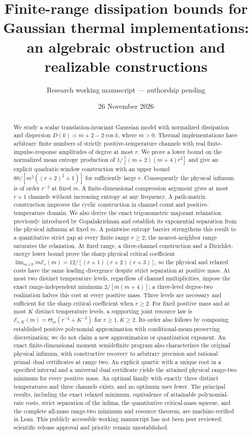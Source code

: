 \documentclass[11pt]{article}
\title{Finite-range dissipation bounds for Gaussian thermal implementations:\\ an algebraic obstruction and realizable constructions}
\author{Research working manuscript --- authorship pending}
\date{26 November 2026}
\begin{document}
\maketitle
\begin{abstract}
We study a scalar translation-invariant Gaussian model with normalized dissipation and dispersion $D(k)=m+2-2\cos k$, where $m>0$. Thermal implementations have arbitrary finite numbers of strictly positive-temperature channels with real finite-impulse-response amplitudes of degree at most $r$. We prove a lower bound on the normalized mean entropy production of $1/[(m+2)(m+4)r^2]$ and give an explicit quadratic-window construction with an upper bound $80/[m^2((r+2)^2+1)]$ for sufficiently large $r$. Consequently the physical infimum is of order $r^{-2}$ at fixed $m$. A finite-dimensional compression argument gives at most $r+1$ channels without increasing entropy at any frequency. A path-matrix construction improves the cyclic construction in channel count and positive-temperature domain. We also derive the exact trigonometric majorant relaxation previously introduced by Gopalakrishnan and establish its exponential separation from the physical infimum at fixed $m$. A pointwise entropy barrier strengthens this result to a quantitative strict gap at every finite range $r\ge2$; the nearest-neighbor range saturates the relaxation. At fixed range, a three-channel construction and a Dirichlet-energy lower bound prove the sharp physical critical coefficient $\lim_{m\downarrow0}m\mathcal E_r(m)=12/[(r+1)(r+2)(r+3)]$, so the physical and relaxed costs have the same leading divergence despite strict separation at positive mass. At most two distinct temperature levels, regardless of channel multiplicities, impose the exact range-independent minimum $2/[m(m+4)]$; a three-level degree-two realization halves this cost at every positive mass. Three levels are necessary and sufficient for the sharp critical coefficient when $r\ge2$. For fixed positive mass and at most $K$ distinct temperature levels, a supporting joint resource law is $\mathcal E_{r,K}(m)=\Theta_m(r^{-2}+K^{-2})$ for $r\ge1,K\ge2$. Its order also follows by composing established positive polynomial approximation with conditional-mean-preserving discretization; we do not claim a new approximation or quantization exponent. An exact finite-dimensional moment semidefinite program also characterizes the original physical infimum, with constructive recovery to arbitrary precision and rational primal--dual certificates at range two. An explicit quartic with a unique root in a specified interval and a universal dual certificate yields the attained physical range-two minimum for every positive mass. An optimal family with exactly three distinct temperatures and three channels exists, and no optimum uses fewer. The principal results, including the exact relaxed minimum, equivalence of attainable polynomial-rate costs, strict separation of the infima, the quantitative critical-mass squeeze, and the complete all-mass range-two minimum and resource theorem, are machine-verified in Lean. This publicly accessible working manuscript has not been peer reviewed; scientific release approval and priority remain unestablished.
\end{abstract}
\end{document}
